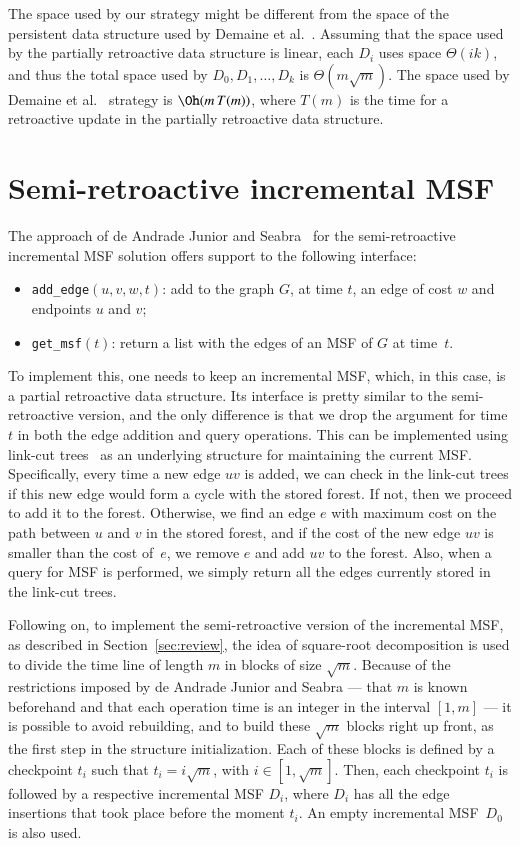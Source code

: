 \documentclass[3p,times,procedia]{elsarticle}
\begin{document}
\medskip 

The space used by our strategy might be different from the space of 
the persistent data structure used by Demaine et al.~\cite{DemaineIL2007}. 
Assuming that the space used by the partially retroactive 
data structure is linear, each $D_i$ uses space $\Theta(ik)$, 
and thus the total space used by $D_0,D_1,\ldots,D_k$ is $\Theta(m\sqrt{m})$. 
The space used by Demaine et al.~\cite{DemaineIL2007} strategy is $\Oh(m\,T(m))$, 
where $T(m)$ is the time for a retroactive update in the partially retroactive data structure. 

\section{Semi-retroactive incremental MSF}\label{sec:incMSF}

The approach of de Andrade Junior and Seabra~\cite{deAndradeJrS2022} for the 
semi-retroactive incremental MSF solution offers support to the following interface:
\begin{itemize}
\item \texttt{add\_edge}$(u,v,w,t)$: add to the graph $G$, at time $t$,
  an edge of cost $w$ and endpoints $u$ and $v$;
\item \texttt{get\_msf}$(t)$: return a list with the edges of an MSF of $G$ at
  time~$t$.
\end{itemize}

To implement this, one needs to keep an incremental MSF, which, in
this case, is a partial retroactive data structure. Its interface is
pretty similar to the semi-retroactive version, and the only difference
is that we drop the argument for time $t$ in both the edge addition and 
query operations. This can be implemented using link-cut trees~\cite{SleatorT1981} 
as an underlying structure for maintaining the current MSF. Specifically, 
every time a new edge $uv$ is added, we can check in the link-cut trees if 
this new edge would form a cycle with the stored forest. If not, then we 
proceed to add it to the forest.  
Otherwise, we find an edge $e$ with maximum cost on the path between $u$ 
and $v$ in the stored forest, and if the cost of the new edge $uv$ is smaller 
than the cost of~$e$, we remove $e$ and add $uv$ to the forest.
Also, when a query for MSF is performed, 
we simply return all the edges currently stored in the link-cut trees.

Following on, to implement the semi-retroactive version of the incremental MSF, 
as described in Section~\ref{sec:review}, the idea of square-root decomposition 
is used to divide the time line of length $m$ in blocks of size $\sqrt{m}$. 
Because of the restrictions imposed by de Andrade Junior and Seabra --- 
that $m$ is known beforehand and that each operation time is an integer in 
the interval $[1, m]$ --- it is possible to avoid rebuilding, and to build 
these $\sqrt{m}$ blocks right up front, as the first step in the structure 
initialization.  Each of these blocks is defined by a checkpoint $t_i$ such 
that $t_i = i \sqrt{m}$, with $i \in [1, \sqrt{m}]$. Then, each checkpoint 
$t_i$ is followed by a respective incremental MSF $D_i$, where $D_i$ has 
all the edge insertions that took place before the moment $t_i$.
An empty incremental MSF~$D_0$ is also used.
\end{document}

